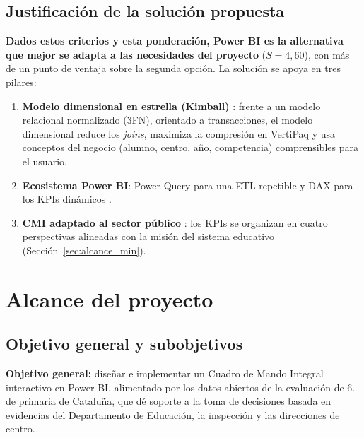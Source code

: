 \documentclass[12pt, a4paper, oneside]{report}
\begin{document}
\section{Justificación de la solución propuesta}
\textbf{Dados estos criterios y esta ponderación, Power BI es la alternativa que mejor se adapta a las necesidades del proyecto} ($S = 4{,}60$), con más de un punto de ventaja sobre la segunda opción. La solución se apoya en tres pilares:
\begin{enumerate}
    \item \textbf{Modelo dimensional en estrella (Kimball)} \cite{kimball2013data}: frente a un modelo relacional normalizado (3FN), orientado a transacciones, el modelo dimensional reduce los \textit{joins}, maximiza la compresión en VertiPaq y usa conceptos del negocio (alumno, centro, año, competencia) comprensibles para el usuario.
    \item \textbf{Ecosistema Power BI}: Power Query para una ETL repetible y DAX para los KPIs dinámicos \cite{ferrari2019definitive}.
    \item \textbf{CMI adaptado al sector público} \cite{niven2008balanced}: los KPIs se organizan en cuatro perspectivas alineadas con la misión del sistema educativo (Sección~\ref{sec:alcance_min}).
\end{enumerate}

\chapter{Alcance del proyecto}

\section{Objetivo general y subobjetivos}
\textbf{Objetivo general:} diseñar e implementar un Cuadro de Mando Integral interactivo en Power BI, alimentado por los datos abiertos de la evaluación de 6.\textordmasculine{} de primaria de Cataluña, que dé soporte a la toma de decisiones basada en evidencias del Departamento de Educación, la inspección y las direcciones de centro.
\end{document}
